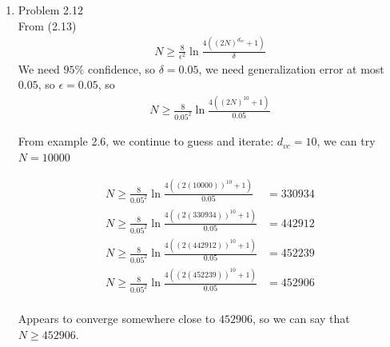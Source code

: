 \documentclass{article}
\begin{document}
\begin{enumerate}
        \item Problem 2.12\\
        From (2.13)
        \begin{align*}
            N \geq \frac{8}{\epsilon^2}\ln{\frac{4((2N)^{d_{vc}}+1)}{\delta}}
        \end{align*}
        We need $95\%$ confidence, so $\delta = 0.05$, we need generalization error at most $0.05$, so $\epsilon = 0.05$, so
        \begin{align*}
            N \geq \frac{8}{0.05^2}\ln{\frac{4((2N)^{10}+1)}{0.05}}
        \end{align*}

        From example 2.6, we continue to guess and iterate: $d_{vc} = 10$, we can try $N = 10000$

        \begin{align*}
            N \geq \frac{8}{0.05^2}\ln{\frac{4((2(10000))^{10}+1)}{0.05}} &= 330934\\
            N \geq \frac{8}{0.05^2}\ln{\frac{4((2(330934))^{10}+1)}{0.05}} &= 442912\\
            N \geq \frac{8}{0.05^2}\ln{\frac{4((2(442912))^{10}+1)}{0.05}} &= 452239\\
            N \geq \frac{8}{0.05^2}\ln{\frac{4((2(452239))^{10}+1)}{0.05}} &= 452906\\
        \end{align*}

        Appears to converge somewhere close to $452906$, so we can say that $N \geq 452906$.
    \end{enumerate}
\end{document}
